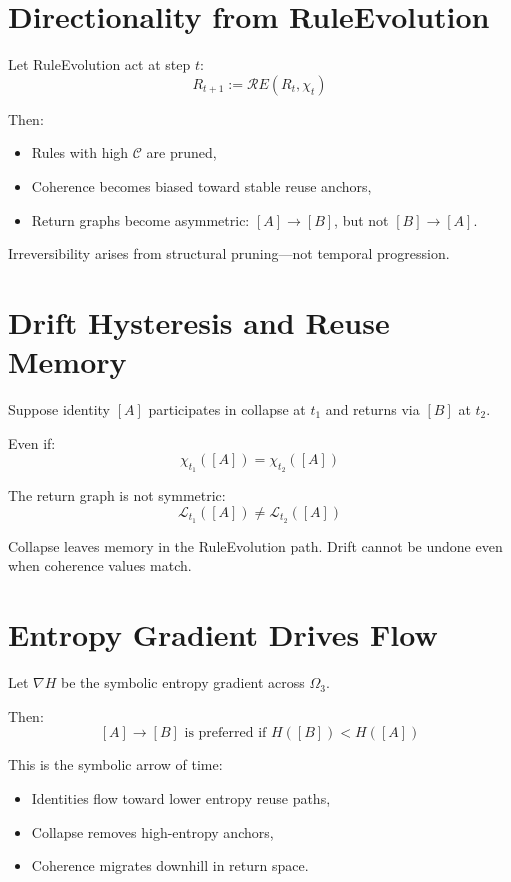 \section{Directionality from RuleEvolution} \label{sec:directionality}

Let RuleEvolution act at step $t$:
\[
R_{t+1} := \mathcal{R}E(R_t,\chi_t)
\]

Then:
\begin{itemize}
  \item Rules with high $\mathcal{C}$ are pruned,
  \item Coherence becomes biased toward stable reuse anchors,
  \item Return graphs become asymmetric: $[A] \to [B]$, but not $[B] \to [A]$.
\end{itemize}

Irreversibility arises from structural pruning—not temporal progression.

\section{Drift Hysteresis and Reuse Memory} \label{sec:hysteresis}

Suppose identity $[A]$ participates in collapse at $t_1$ and returns via $[B]$ at $t_2$.

Even if:
\[
\chi_{t_1}([A]) = \chi_{t_2}([A])
\]

The return graph is not symmetric:
\[
\mathcal{L}_{t_1}([A]) \ne \mathcal{L}_{t_2}([A])
\]

Collapse leaves memory in the RuleEvolution path. Drift cannot be undone even when coherence values match.

\section{Entropy Gradient Drives Flow} \label{sec:entropy-gradient}

Let $\nabla H$ be the symbolic entropy gradient across $\Omega_3$.

Then:
\[
[A] \to [B] \text{ is preferred if } H([B]) < H([A])
\]

This is the symbolic arrow of time:
\begin{itemize}
  \item Identities flow toward lower entropy reuse paths,
  \item Collapse removes high-entropy anchors,
  \item Coherence migrates downhill in return space.
\end{itemize}

